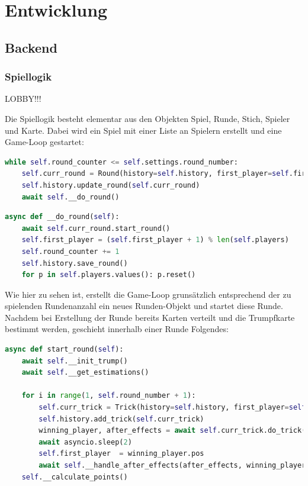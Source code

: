 \chapter{Entwicklung}

\section{Backend}

\subsection{Spiellogik}

LOBBY!!!

Die Spiellogik besteht elementar aus den Objekten Spiel, Runde, Stich, Spieler und Karte. Dabei wird ein Spiel mit einer Liste an Spielern erstellt und eine Game-Loop gestartet:

\begin{lstlisting}[language=Python]
while self.round_counter <= self.settings.round_number:
	self.curr_round = Round(history=self.history, first_player=self.first_player, round_counter=self.round_counter)
	self.history.update_round(self.curr_round)
	await self.__do_round()
\end{lstlisting}

\begin{lstlisting}[language=Python]
async def __do_round(self):
	await self.curr_round.start_round()
	self.first_player = (self.first_player + 1) % len(self.players)
	self.round_counter += 1
	self.history.save_round()
	for p in self.players.values(): p.reset()
\end{lstlisting}

Wie hier zu sehen ist, erstellt die Game-Loop grunsätzlich entsprechend der zu spielenden Rundenanzahl ein neues Runden-Objekt und startet diese Runde. Nachdem bei Erstellung der Runde bereits Karten verteilt und die Trumpfkarte bestimmt werden, geschieht innerhalb einer Runde Folgendes:

\begin{lstlisting}[language=Python]
async def start_round(self):
	await self.__init_trump()
	await self.__get_estimations()
	
	for i in range(1, self.round_number + 1):
		self.curr_trick = Trick(history=self.history, first_player=self.first_player, trick_number=i, trump_color=self.trump_color)
		self.history.add_trick(self.curr_trick)
		winning_player, after_effects = await self.curr_trick.do_trick()
		await asyncio.sleep(2)
		self.first_player  = winning_player.pos
		await self.__handle_after_effects(after_effects, winning_player, i)
	self.__calculate_points()
\end{lstlisting}

